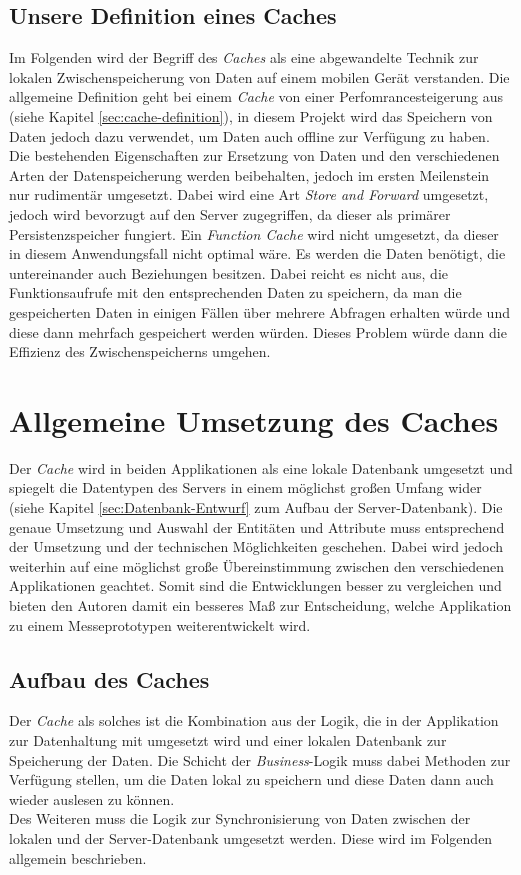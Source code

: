 \subsection{Unsere Definition eines Caches}
\label{ssec:cache-unsere-definition}
Im Folgenden wird der Begriff des \textit{Caches} als eine abgewandelte Technik zur lokalen Zwischenspeicherung von Daten auf einem mobilen Gerät verstanden. Die allgemeine Definition geht bei einem \textit{Cache} von einer Perfomrancesteigerung aus (siehe Kapitel \ref{sec:cache-definition}), in diesem Projekt wird das Speichern von Daten jedoch dazu verwendet, um Daten auch offline zur Verfügung zu haben. Die bestehenden Eigenschaften zur Ersetzung von Daten und den verschiedenen Arten der Datenspeicherung werden beibehalten, jedoch im ersten Meilenstein nur rudimentär umgesetzt. Dabei wird eine Art \textit{Store and Forward} umgesetzt, jedoch wird bevorzugt auf den Server zugegriffen, da dieser als primärer Persistenzspeicher fungiert. Ein \textit{Function Cache} wird nicht umgesetzt, da dieser in diesem Anwendungsfall nicht optimal wäre. Es werden die Daten benötigt, die untereinander auch Beziehungen besitzen. Dabei reicht es nicht aus, die Funktionsaufrufe mit den entsprechenden Daten zu speichern, da man die gespeicherten Daten in einigen Fällen über mehrere Abfragen erhalten würde und diese dann mehrfach gespeichert werden würden. Dieses Problem würde dann die Effizienz des Zwischenspeicherns umgehen.

\section{Allgemeine Umsetzung des Caches}
\label{sec:cache-umsetzung}
Der \textit{Cache} wird in beiden Applikationen als eine lokale Datenbank umgesetzt und spiegelt die Datentypen des Servers in einem möglichst großen Umfang wider (siehe Kapitel \ref{sec:Datenbank-Entwurf} zum Aufbau der Server-Datenbank). Die genaue Umsetzung und Auswahl der Entitäten und Attribute muss entsprechend der Umsetzung und der technischen Möglichkeiten geschehen. Dabei wird jedoch weiterhin auf eine möglichst große Übereinstimmung zwischen den verschiedenen Applikationen geachtet. Somit sind die Entwicklungen besser zu vergleichen und bieten den Autoren damit ein besseres Maß zur Entscheidung, welche Applikation zu einem Messeprototypen weiterentwickelt wird.

\subsection{Aufbau des Caches}
\label{ssec:cache-aufbau}
Der \textit{Cache} als solches ist die Kombination aus der Logik, die in der Applikation zur Datenhaltung mit umgesetzt wird und einer lokalen Datenbank zur Speicherung der Daten. Die Schicht der \textit{Business}-Logik muss dabei Methoden zur Verfügung stellen, um die Daten lokal zu speichern und diese Daten dann auch wieder auslesen zu können.\\
Des Weiteren muss die Logik zur Synchronisierung von Daten zwischen der lokalen und der Server-Datenbank umgesetzt werden. Diese wird im Folgenden allgemein beschrieben.

